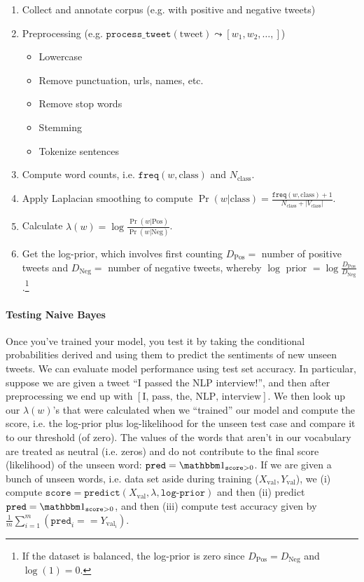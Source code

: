 \documentclass[12pt]{article}
\begin{document}
\begin{enumerate}
\item Collect and annotate corpus (e.g. with positive and negative tweets)
\item Preprocessing (e.g. $\texttt{process\_tweet}(\textrm{tweet}) \leadsto [w_1, w_2, \ldots, ]$)
    \begin{itemize}
    \item Lowercase
    \item Remove punctuation, urls, names, etc.
    \item Remove stop words
    \item Stemming
    \item Tokenize sentences
  \end{itemize}
\item Compute word counts, i.e. $\texttt{freq}(w, \textrm{class})$ and   $N_{\textrm{class}}$.
\item Apply Laplacian smoothing to compute $\Pr(w | \textrm{class}) = \frac{\texttt{freq}(w, \textrm{class}) + 1}{N_{\textrm{class}} +   |V_{\textrm{class}}|}$.
\item Calculate $\lambda(w) = \log \frac{\Pr(w | \textrm{Pos})}{\Pr(w |     \textrm{Neg})}$.
\item Get the log-prior, which involves first counting $D_{\textrm{Pos}} = $ number of positive tweets and $D_{\textrm{Neg}} = $ number of negative tweets, whereby $\log \textrm{ prior } = \log \frac{D_{\textrm{Pos}}}{D_{\textrm{Neg}}}$.\footnote{If the dataset is balanced, the log-prior is zero since $D_{\textrm{Pos}} = D_{\textrm{Neg}}$ and $\log(1) = 0$.}
\end{enumerate}

\paragraph{Testing Naive Bayes} Once you've trained your model, you test it by taking the conditional probabilities derived and using them to predict the sentiments of new unseen tweets. We can evaluate model performance using test set accuracy. In particular, suppose we are given a tweet ``I passed the NLP interview!'', and then after preprocessing we end up with $[\textrm{I, pass, the, NLP, interview}]$. We then look up our $\lambda(w)$'s that were calculated when we ``trained'' our model and compute the score, i.e. the log-prior plus log-likelihood for the unseen test case and compare it to our threshold (of zero). The values of the words that aren't in our vocabulary are treated as neutral (i.e. zeros) and do not contribute to the final score (likelihood) of the unseen word: $\texttt{pred} = \mathbbm 1_{\texttt{score} > 0}$. If we are given a bunch of unseen words, i.e. data set aside during training ($X_{\textrm{val}}, Y_{\textrm{val}}$), we (i) compute $\texttt{score} = \texttt{predict}(X_{\textrm{val}}, \lambda, \texttt{log-prior})$ and then (ii) predict $\texttt{pred} = \mathbbm 1_{\texttt{score} > 0}$, and then (iii) compute test accuracy given by $\frac{1}{m} \sum_{i=1}^m \left(\texttt{pred}_i   == Y_{\textrm{val}_i}\right)$.
\end{document}
